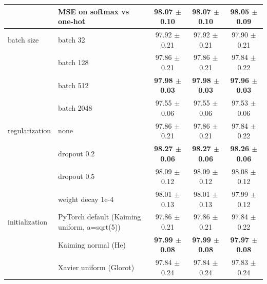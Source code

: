 \begin{tabular}{llccc}
 & MSE on softmax vs one-hot & 98.07 $\pm$ 0.10 & 98.07 $\pm$ 0.10 & 98.05 $\pm$ 0.09 \\
\hline
batch size & batch 32 & 97.92 $\pm$ 0.21 & 97.92 $\pm$ 0.21 & 97.90 $\pm$ 0.21 \\
 & batch 128 & 97.86 $\pm$ 0.21 & 97.86 $\pm$ 0.21 & 97.84 $\pm$ 0.22 \\
 & batch 512 & \textbf{97.98 $\pm$ 0.03} & \textbf{97.98 $\pm$ 0.03} & \textbf{97.96 $\pm$ 0.03} \\
 & batch 2048 & 97.55 $\pm$ 0.06 & 97.55 $\pm$ 0.06 & 97.53 $\pm$ 0.06 \\
\hline
regularization & none & 97.86 $\pm$ 0.21 & 97.86 $\pm$ 0.21 & 97.84 $\pm$ 0.22 \\
 & dropout 0.2 & \textbf{98.27 $\pm$ 0.06} & \textbf{98.27 $\pm$ 0.06} & \textbf{98.26 $\pm$ 0.06} \\
 & dropout 0.5 & 98.09 $\pm$ 0.12 & 98.09 $\pm$ 0.12 & 98.08 $\pm$ 0.12 \\
 & weight decay 1e-4 & 98.01 $\pm$ 0.13 & 98.01 $\pm$ 0.13 & 97.99 $\pm$ 0.12 \\
\hline
initialization & PyTorch default (Kaiming uniform, a=sqrt(5)) & 97.86 $\pm$ 0.21 & 97.86 $\pm$ 0.21 & 97.84 $\pm$ 0.22 \\
 & Kaiming normal (He) & \textbf{97.99 $\pm$ 0.08} & \textbf{97.99 $\pm$ 0.08} & \textbf{97.97 $\pm$ 0.08} \\
 & Xavier uniform (Glorot) & 97.84 $\pm$ 0.24 & 97.84 $\pm$ 0.24 & 97.83 $\pm$ 0.24 \\
\hline
\end{tabular}
